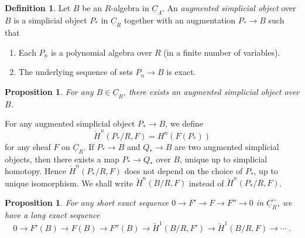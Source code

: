 \documentclass[11pt]{article}
\theoremstyle{plain}
\newtheorem{proposition}[theorem]{Proposition}
\theoremstyle{definition}
\newtheorem{definition}[theorem]{Definition}
\theoremstyle{remark}
\begin{document}
\begin{definition}
Let $B$ be an $R$-algebra in $\underline{C}_{\Lambda}$. An \emph{augmented simplicial object} over $B$ is a simplicial object $P_*$ in $\underline{C}_{R}$ together with an augmentation $P_* \to B$ such that
\begin{enumerate}
\item[(i)] Each $P_n$ is a polynomial algebra over $R$ (in a finite number of variables).
\item[(ii)] The underlying sequence of sets $P_n \to B$ is exact.
\end{enumerate}
\end{definition}

\begin{proposition}
For any $B \in \underline{C}_{R}$, there exists an augmented simplicial object over $B$.
\end{proposition}

For any augmented simplicial object $P_* \to B$, we define
\[
\check{H}^n(P_*/R, F) = H^n(F(P_*))
\]
for any sheaf $F$ on $\underline{C}_{R}$. If $P_* \to B$ and $Q_* \to B$ are two augmented simplicial objects, then there exists a map $P_* \to Q_*$ over $B$, unique up to simplicial homotopy. Hence $\check{H}^n(P_*/R, F)$ does not depend on the choice of $P_*$, up to unique isomorphism. We shall write $\check{H}^n(B/R, F)$ instead of $\check{H}^n(P_*/R, F)$.

\begin{proposition}
For any short exact sequence $0 \to F' \to F \to F'' \to 0$ in $\underline{C}_{R}^{\sim}$, we have a long exact sequence
\[
0 \to F'(B) \to F(B) \to F''(B) \to \check{H}^1(B/R, F') \to \check{H}^1(B/R, F) \to \cdots\;.
\]
\end{proposition}
\end{document}
